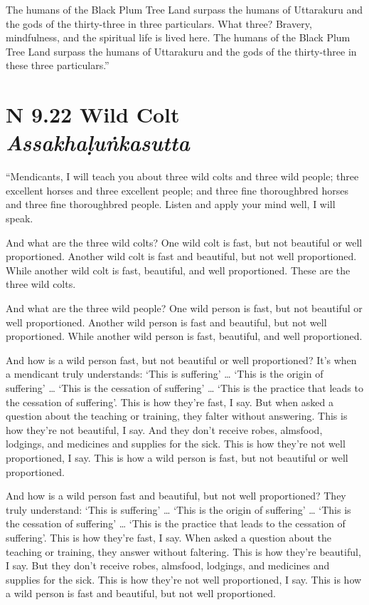 \documentclass[12pt,openany]{book}%
\newcommand*{\suttatitleacronym}[1]{\smaller[2]{#1}\vspace*{.3em}}
\newcommand*{\suttatitletranslation}[1]{\linebreak{#1}}
\newcommand*{\suttatitleroot}[1]{\linebreak\smaller[2]\itshape{#1}}
\newcommand*{\tocacronym}[1]{\hspace*{-3.3em}{#1}\quad}
\newcommand*{\toctranslation}[1]{#1}
\newcommand*{\tocroot}[1]{(\textit{#1})}
\begin{document}
The humans of the Black Plum Tree Land surpass the humans of Uttarakuru and the gods of the thirty-three in three particulars. What three? Bravery, mindfulness, and the spiritual life is lived here. The humans of the Black Plum Tree Land surpass the humans of Uttarakuru and the gods of the thirty-three in these three particulars.” 

%
\section*{{\suttatitleacronym AN 9.22}{\suttatitletranslation A Wild Colt }{\suttatitleroot Assakhaḷuṅkasutta}}
\addcontentsline{toc}{section}{\tocacronym{AN 9.22} \toctranslation{A Wild Colt } \tocroot{Assakhaḷuṅkasutta}}

“Mendicants, I will teach you about three wild colts and three wild people; three excellent horses and three excellent people; and three fine thoroughbred horses and three fine thoroughbred people. Listen and apply your mind well, I will speak. 

And what are the three wild colts? One wild colt is fast, but not beautiful or well proportioned. Another wild colt is fast and beautiful, but not well proportioned. While another wild colt is fast, beautiful, and well proportioned. These are the three wild colts. 

And what are the three wild people? One wild person is fast, but not beautiful or well proportioned. Another wild person is fast and beautiful, but not well proportioned. While another wild person is fast, beautiful, and well proportioned. 

And how is a wild person fast, but not beautiful or well proportioned? It’s when a mendicant truly understands: ‘This is suffering’ … ‘This is the origin of suffering’ … ‘This is the cessation of suffering’ … ‘This is the practice that leads to the cessation of suffering’. This is how they’re fast, I say. But when asked a question about the teaching or training, they falter without answering. This is how they’re not beautiful, I say. And they don’t receive robes, almsfood, lodgings, and medicines and supplies for the sick. This is how they’re not well proportioned, I say. This is how a wild person is fast, but not beautiful or well proportioned. 

And how is a wild person fast and beautiful, but not well proportioned? They truly understand: ‘This is suffering’ … ‘This is the origin of suffering’ … ‘This is the cessation of suffering’ … ‘This is the practice that leads to the cessation of suffering’. This is how they’re fast, I say. When asked a question about the teaching or training, they answer without faltering. This is how they’re beautiful, I say. But they don’t receive robes, almsfood, lodgings, and medicines and supplies for the sick. This is how they’re not well proportioned, I say. This is how a wild person is fast and beautiful, but not well proportioned. 
\end{document}
